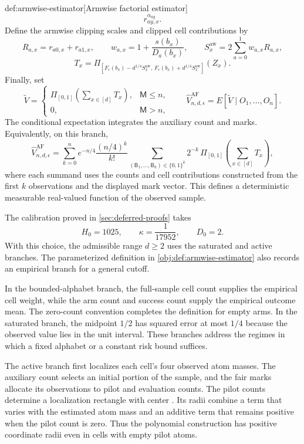 \documentclass[11pt]{article}
\begin{document}
\begin{algorithmv}{def:armwise-estimator}[Armwise factorial estimator]
\[{r_{ay,x}^{\alpha_{ay}}}.
\]
Define the armwise clipping scales and clipped cell contributions by
\[
R_{a,x}=r_{a0,x}+r_{a1,x},\qquad
w_{a,x}=1+\frac{s(b_x)}{D_a(b_x)},\qquad
S_x^{\mathrm{aw}}=2\sum_{a=0}^{1}w_{a,x}R_{a,x},
\]
\[
T_x
=
\Pi_{[F_\epsilon(b_x)-d^{1/4}S_x^{\mathrm{aw}},\,
       F_\epsilon(b_x)+d^{1/4}S_x^{\mathrm{aw}}]}(Z_x).
\]
Finally, set
\[
\widetilde V
=
\begin{cases}
\displaystyle\Pi_{[0,1]}\left(\sum_{x\in[d]}T_x\right),
&\mathsf M\le n,\\[4pt]
0,&\mathsf M>n,
\end{cases}
\qquad
\widehat V_{n,d,\epsilon}^{\mathrm{AF}}
=
E[\widetilde V\mid O_1,\ldots,O_n].
\]
The conditional expectation integrates the auxiliary count and marks. Equivalently, on this branch,
\[
\widehat V_{n,d,\epsilon}^{\mathrm{AF}}
=
\sum_{k=0}^{n}
e^{-n/4}\frac{(n/4)^k}{k!}
\sum_{(\mathsf B_1,\ldots,\mathsf B_k)\in\{0,1\}^k}
2^{-k}\,
\Pi_{[0,1]}\left(\sum_{x\in[d]}T_x\right),
\]
where each summand uses the counts and cell contributions constructed from the first \(k\) observations and the displayed mark vector. This defines a deterministic measurable real-valued function of the observed sample.
\end{algorithmv}

The calibration proved in \cref{sec:deferred-proofs} takes
\[
H_0=1025,
\qquad
\kappa=\frac1{17952},
\qquad
D_0=2.
\]
With this choice, the admissible range \(d\ge2\) uses the saturated and active branches. The parameterized definition in \cref{obj:def:armwise-estimator} also records an empirical branch for a general cutoff.

In the bounded-alphabet branch, the full-sample cell count  supplies the empirical cell weight, while the arm count  and success count  supply the empirical outcome mean. The zero-count convention completes the definition for empty arms. In the saturated branch, the midpoint \(1/2\) has squared error at most \(1/4\) because the observed value lies in the unit interval. These branches address the regimes in which a fixed alphabet or a constant risk bound suffices.

The active branch first localizes each cell's four observed atom masses. The auxiliary count  selects an initial portion of the sample, and the fair marks  allocate its observations to pilot and evaluation counts. The pilot counts  determine a localization rectangle  with center . Its radii combine a term that varies with the estimated atom mass and an additive term that remains positive when the pilot count is zero. Thus the polynomial construction has positive coordinate radii even in cells with empty pilot atoms.
\end{document}
